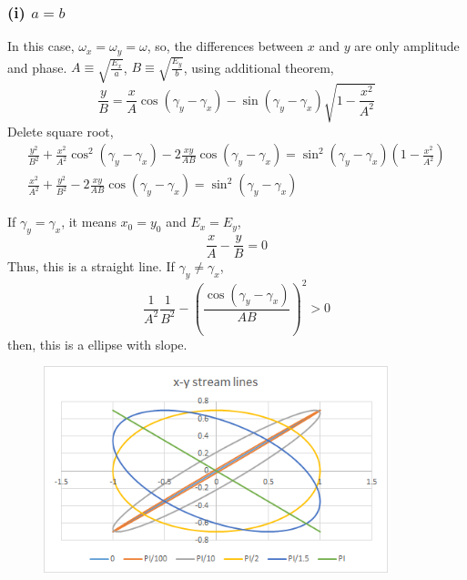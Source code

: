 \documentclass{jarticle}
\begin{document}
\subsubsection*{(i) $a = b$}
In this case, $\omega_x = \omega_y = \omega$, so, the differences between $x$ and $y$ are only amplitude and phase.
$A \equiv \sqrt{\frac{E_x}{a}}$, $B \equiv \sqrt{\frac{E_y}{b}}$, using additional theorem, 
\begin{equation}
	\frac{y}{B} = \frac{x}{A}\cos(\gamma_y-\gamma_x) - \sin(\gamma_y - \gamma_x)\sqrt{1-\frac{x^2}{A^2}}
\end{equation}
Delete square root, 
\begin{eqnarray}
	\frac{y^2}{B^2} +\frac{x^2}{A^2}\cos^2(\gamma_y - \gamma_x) - 2\frac{xy}{AB}\cos(\gamma_y - \gamma_x) = \sin^2(\gamma_y - \gamma_x)\left(1-\frac{x^2}{A^2}\right) \nonumber \\
	\frac{x^2}{A^2} + \frac{y^2}{B^2} -2\frac{xy}{AB}\cos(\gamma_y - \gamma_x) = \sin^2(\gamma_y - \gamma_x) \nonumber
\end{eqnarray}

If $\gamma_y = \gamma_x$, it means $x_0 = y_0$ and $E_x = E_y$, 
\[
	\frac{x}{A} - \frac{y}{B} = 0
\]
Thus, this is a straight line.
If $\gamma_y \neq \gamma_x$, 
\[
	\frac{1}{A^2}\frac{1}{B^2} - \left( \frac{\cos(\gamma_y - \gamma_x)}{AB} \right)^2 >0
\]
then, this is a ellipse with slope.

\begin{figure}[htbp]
	\includegraphics[width=10cm]{two_dim_harmonic_streamline.png}
\end{figure}
\end{document}
